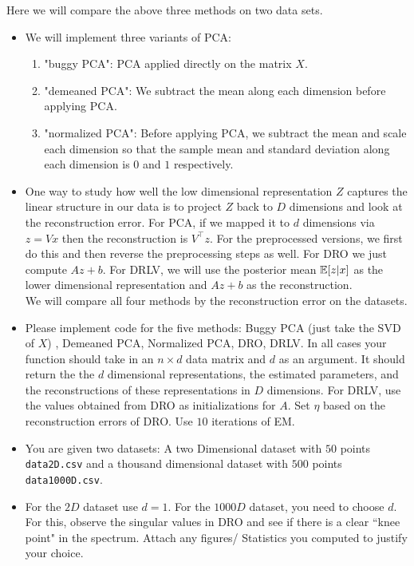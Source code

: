 Here we will compare the above three methods on two data sets. 

\begin{itemize}
\item We will implement three variants of PCA:
\begin{enumerate}
    \item "buggy PCA": PCA applied directly on the matrix $X$.
    \item "demeaned PCA": We subtract the mean along each dimension before applying PCA.
    \item "normalized PCA": Before applying PCA, we subtract the mean and scale each dimension so that the sample  mean and standard deviation along each dimension is $0$ and $1$ respectively.
    
\end{enumerate}



\item 
One way to study how well the low dimensional representation $Z$ captures the linear
structure in our data is to project $Z$ back to $D$ dimensions and look at the reconstruction
error. For PCA, if we mapped it to $d$ dimensions via $z = Vx$ then the
reconstruction is $V^\top z$. For the preprocessed versions, we first do this and then
reverse the preprocessing steps as well. For DRO  we just compute $Az + b$.
For DRLV, we will use the posterior mean $\mathbb{E}[z|x]$ as the lower dimensional
representation and $Az + b$ as the reconstruction. \\
We will compare all four methods by the reconstruction error on the datasets.

\item 
Please implement code for the five methods: Buggy PCA (just take the SVD of $X$)
, Demeaned PCA,
Normalized PCA, DRO, DRLV. In all cases your function should take in
an $n \times d$ data matrix and $d$ as an argument. It should return the
the $d$ dimensional representations, the estimated parameters, and the
reconstructions of these representations in $D$ dimensions. 
For DRLV, use the values obtained from DRO as initializations for $A$. Set $\eta$
based on the reconstruction errors of DRO.
Use $10$ iterations of EM.

\item
You are given two datasets: A two Dimensional dataset with $50$ points 
\texttt{data2D.csv} and a thousand dimensional dataset with $500$ points
\texttt{data1000D.csv}. 

\item
For the $2D$ dataset use $d=1$. For the $1000D$ dataset, you need to choose
$d$. For this, observe the singular values in DRO and see if there is a clear
``knee point" in the spectrum.
Attach any figures/ Statistics you computed to justify your choice.


\end{itemize}
